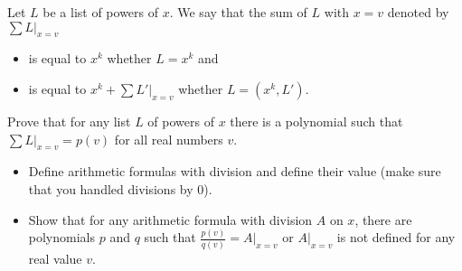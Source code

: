 \begin{chapterendexercises}
        Let $L$ be a list of powers of $x$. We say that the sum of $L$
        with $x = v$ denoted by $\sum L\big\rvert_{x = v}$
        \begin{itemize}
            \item is equal to $x^k$ whether $L = x^k$ and
            \item is equal to $x^k + \sum L'\big\rvert_{x = v}$ whether
                $L = (x^k, L')$.
        \end{itemize}

        Prove that for any list $L$ of powers of $x$ there is a polynomial such that
        $\sum L\big\rvert_{x = v} = p(v)$ for all real numbers $v$.
    \exercise
        \begin{itemize}
            \item Define arithmetic formulas with division and define their value (make
                sure that you handled divisions by $0$).

            \item Show that for any arithmetic formula with division $A$ on $x$,
                there are polynomials $p$ and $q$ such that $\frac{p(v)}{q(v)} =
                A\big\rvert_{x = v}$ or $A\big\rvert_{x = v}$ is not defined for
                any real value $v$.
        \end{itemize}
\end{chapterendexercises}
